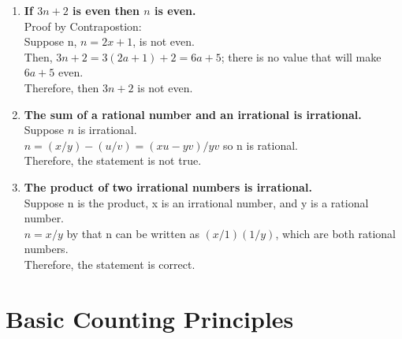 \documentclass[11pt]{article}
\begin{document}
\begin{enumerate}
\item
\textbf{If $3n+2$ is even then $n$ is even.}\\
Proof by Contrapostion:\\
Suppose n, $n=2x+1$, is not even.\\
Then, $3n+2=3(2a+1)+2=6a+5$; there is no value that will make $6a+5$ even.\\
Therefore, then $3n+2$ is not even.\\

\item
\textbf{The sum of a rational number and an irrational is irrational.}\\
Suppose $n$ is irrational.\\
$n=(x/y)-(u/v)=(xu-yv)/yv$ so n is rational.\\
Therefore, the statement is not true.\\

\item
\textbf{The product of two irrational numbers is irrational.}\\
Suppose n is the product, x is an irrational number, and y is a rational number.\\
$n=x/y$ by that n can be written as $(x/1)(1/y)$, which are both rational numbers.\\
Therefore, the statement is correct.\\

\end{enumerate}

\section{Basic Counting Principles}
\end{document}
